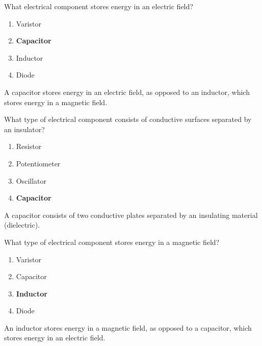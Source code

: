 
\begin{tcolorbox}[colback=gray!10!white,colframe=black!75!black,title={T6A04}]
    What electrical component stores energy in an electric field?
    \begin{enumerate}[label=\Alph*),noitemsep]
        \item Varistor
        \item \textbf{Capacitor}
        \item Inductor
        \item Diode
    \end{enumerate}
\end{tcolorbox}
A capacitor stores energy in an electric field, as opposed to an inductor, which stores energy in a magnetic field.


\begin{tcolorbox}[colback=gray!10!white,colframe=black!75!black,title={T6A05}]
    What type of electrical component consists of conductive surfaces separated by an insulator?
    \begin{enumerate}[label=\Alph*),noitemsep]
        \item Resistor
        \item Potentiometer
        \item Oscillator
        \item \textbf{Capacitor}
    \end{enumerate}
\end{tcolorbox}
A capacitor consists of two conductive plates separated by an insulating material (dielectric).


\begin{tcolorbox}[colback=gray!10!white,colframe=black!75!black,title={T6A06}]
    What type of electrical component stores energy in a magnetic field?
    \begin{enumerate}[label=\Alph*),noitemsep]
        \item Varistor
        \item Capacitor
        \item \textbf{Inductor}
        \item Diode
    \end{enumerate}
\end{tcolorbox}
An inductor stores energy in a magnetic field, as opposed to a capacitor, which stores energy in an electric field.

